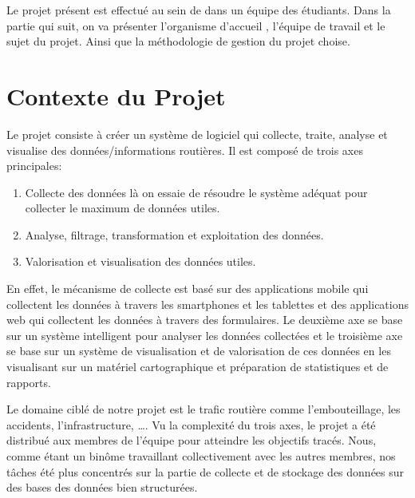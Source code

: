 
Le projet présent est effectué au sein de  dans un
équipe des étudiants. Dans la partie qui suit, on va présenter l'organisme
d'accueil , l'équipe de travail et le sujet du
projet. Ainsi que la méthodologie de gestion du projet choise.

\section{Contexte du Projet}

Le projet  consiste à créer un système de logiciel qui
collecte, traite, analyse et visualise des données/informations routières. Il
est composé de trois axes principales:

\begin{enumerate}
    \item Collecte des données là on essaie de résoudre le système adéquat pour
        collecter le maximum de données utiles.
    \item Analyse, filtrage, transformation et exploitation des données.
    \item Valorisation et visualisation des données utiles.
\end{enumerate}

En effet, le mécanisme de collecte est basé sur des applications mobile qui
collectent les données à travers les smartphones et les tablettes et des
applications web qui collectent les données à travers des formulaires. Le
deuxième axe se base sur un système intelligent pour analyser les données
collectées et le troisième axe se base sur un système de visualisation et de
valorisation de ces données en les visualisant sur un matériel cartographique
et préparation de statistiques et de rapports.

Le domaine ciblé de notre projet est le trafic routière comme l'embouteillage,
les accidents, l'infrastructure, \ldots.  Vu la complexité du trois axes, le
projet a été distribué aux membres de l'équipe  pour
atteindre les objectifs tracés. Nous, comme étant un binôme travaillant
collectivement avec les autres membres, nos tâches été plus concentrés sur la
partie de collecte et de stockage des données sur des bases des données bien
structurées.

